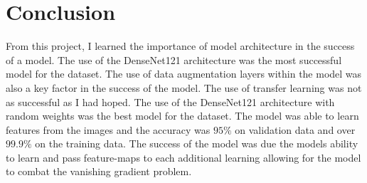 \documentclass[conference]{IEEEtran}
\begin{document}
\section{Conclusion}

From this project, I learned the importance of model architecture in the success of a model. The use of the DenseNet121 architecture was the most successful model for the dataset. The use of data augmentation layers within the model was also a key factor in the success of the model. The use of transfer learning was not as successful as I had hoped. The use of the DenseNet121 architecture with random weights was the best model for the dataset. The model was able to learn features from the images and the accuracy was $95\%$ on validation data and over $99.9\%$ on the training data. The success of the model was due the models ability to learn and pass feature-maps to each additional learning allowing for the model to combat the vanishing gradient problem. 



\end{document}
